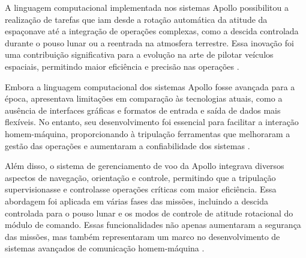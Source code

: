 A linguagem computacional implementada nos sistemas Apollo possibilitou a realização de tarefas que iam desde a rotação automática da atitude da espaçonave até a integração de operações complexas, como a descida controlada durante o pouso lunar ou a reentrada na atmosfera terrestre. Essa inovação foi uma contribuição significativa para a evolução na arte de pilotar veículos espaciais, permitindo maior eficiência e precisão nas operações \citep{nevins1971}.

Embora a linguagem computacional dos sistemas Apollo fosse avançada para a época, apresentava limitações em comparação às tecnologias atuais, como a ausência de interfaces gráficas e formatos de entrada e saída de dados mais flexíveis. No entanto, seu desenvolvimento foi essencial para facilitar a interação homem-máquina, proporcionando à tripulação ferramentas que melhoraram a gestão das operações e aumentaram a confiabilidade dos sistemas \citep{nevins1971}.

Além disso, o sistema de gerenciamento de voo da Apollo integrava diversos aspectos de navegação, orientação e controle, permitindo que a tripulação supervisionasse e controlasse operações críticas com maior eficiência. Essa abordagem foi aplicada em várias fases das missões, incluindo a descida controlada para o pouso lunar e os modos de controle de atitude rotacional do módulo de comando. Essas funcionalidades não apenas aumentaram a segurança das missões, mas também representaram um marco no desenvolvimento de sistemas avançados de comunicação homem-máquina \citep{nevins1971}.


